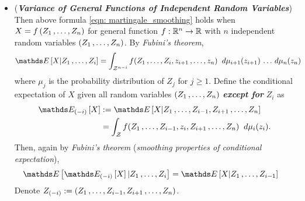 \documentclass[11pt]{article}
\begin{document}
\begin{itemize}
\item \begin{remark}(\textbf{\emph{Variance of General Functions of Independent Random Variables}})\\
Then above formula \eqref{eqn: martingale_smoothing} holds when $X = f\left(Z_1 \,{,}\ldots{,}\, Z_n\right)$ for general function $f: {\mathbb R}^n \to {\mathbb R}$ with $n$ independent random variables $(Z_1 \,{,}\ldots{,}\, Z_n)$. By \emph{Fubini's theorem},
\begin{align*}
 \E{}{X | Z_1 \xdotx{,} Z_i} &= \int_{\cZ^{n-i}} f(Z_1 \xdotx{,} Z_i, z_{i+1} \xdotx{,} z_n) \;\;d\mu_{i+1}(z_{i+1})  \xdotx{} d\mu_{n}(z_{n})
\end{align*} where $\mu_j$ is the probability distribution of $Z_j$ for $j \ge 1$. Define the conditional expectation of $X$ given all random variables  $(Z_1 \,{,}\ldots{,}\, Z_n)$ \emph{\textbf{except for}} $Z_i$ as 
\begin{align*}
 \E{(-i)}{X} &:= \E{}{X | Z_1 \xdotx{,} Z_{i-1}, Z_{i+1} \xdotx{,} Z_n} \\
 &= \int_{\cZ} f(Z_1 \xdotx{,} Z_{i-1}, z_{i}, Z_{i+1} \xdotx{,} Z_n) \;\;d\mu_{i}(z_{i}).
\end{align*} Then, again by \emph{Fubini's theorem} (\emph{smoothing properties of conditional expectation}),
\begin{align}
\E{}{ \E{(-i)}{X} | Z_1 \xdotx{,} Z_i} &= \E{}{X | Z_1 \xdotx{,} Z_{i-1}} \label{eqn: martingale_smoothing_expectation}
\end{align} Denote $Z_{(-i)} := (Z_1 \,{,}\ldots{,}\, Z_{i-1}, Z_{i+1} \,{,}\ldots{,}\, Z_n)$.
\end{remark}


\end{itemize}
\end{document}
